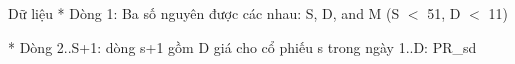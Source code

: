 Dữ liệu
* Dòng 1: Ba số nguyên được các nhau: S, D, and M (S $<$ 51, D $<$ 11)  

   * Dòng 2..S+1: dòng s+1 gồm D giá cho cổ phiếu s trong ngày 1..D: PR\_sd